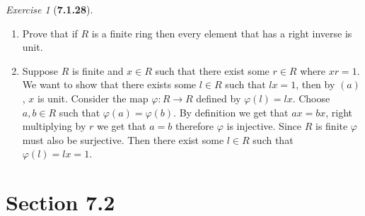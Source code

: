 \documentclass[12pt]{amsart}
\makeatletter
\theoremstyle{remark}
\newtheorem*{exercise}{Exercise}%
\renewenvironment{proof}[1][\proofname]{\par\doublespacing
  \pushQED{\qed}%
  \normalfont \topsep6\p@\@plus6\p@\relax
  \list{}{%
    \settowidth{\leftmargin}{\itshape\proofname:\hskip\labelsep}%
    \setlength{\labelwidth}{0pt}%
    \setlength{\itemindent}{-\leftmargin}%
  }%
  \item[\hskip\labelsep\itshape#1\@addpunct{:}]\ignorespaces
}{%
  \popQED\endlist\@endpefalse
  \singlespacing
}
\theoremstyle{mycomment}
\makeatother
\begin{document}
\begin{exercise}[\textbf{7.1.28}]
\begin{enumerate}
    \item[(d)] Prove that if $R$ is a finite ring then every element that has a right inverse is unit. 
    \begin{proof} Suppose $R$ is finite and $x \in R$ such that there exist some $r \in R$ where $xr = 1$. We want to show that 
      there exists some $l \in R$ such that $lx = 1$, then by $(a)$, $x$ is unit. Consider the map $\varphi: R \to R$ defined by 
      $\varphi(l) = lx$. Choose $a, b \in R$ such that $\varphi(a) = \varphi (b)$. By definition we get that $ax = bx$, right multiplying by 
      $r$ we get that $a = b$ therefore $\varphi$ is injective. Since $R$ is finite $\varphi$ must also be surjective. Then there exist some $l \in R$ such that $\varphi(l) = lx = 1$.
    \end{proof}
    \vspace{.15in}


  \end{enumerate}
\end{exercise}
\vspace{.15in}


\section*{\textbf{Section 7.2}}
\end{document}
